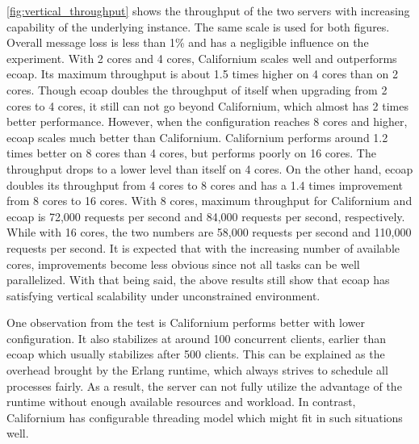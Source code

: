 \autoref{fig:vertical_throughput} shows the throughput of the two servers with increasing capability of the underlying instance. The same scale is used for both figures. Overall message loss is less than 1\% and has a negligible influence on the experiment. With 2 cores and 4 cores, Californium scales well and outperforms ecoap. Its maximum throughput is about 1.5 times higher on 4 cores than on 2 cores. Though ecoap doubles the throughput of itself when upgrading from 2 cores to 4 cores, it still can not go beyond Californium, which almost has 2 times better performance. However, when the configuration reaches 8 cores and higher, ecoap scales much better than Californium. Californium performs around 1.2 times better on 8 cores than 4 cores, but performs poorly on 16 cores. The throughput drops to a lower level than itself on 4 cores. On the other hand,  ecoap doubles its throughput from 4 cores to 8 cores and has a 1.4 times improvement from 8 cores to 16 cores. With 8 cores, maximum throughput for Californium and ecoap is 72,000 requests per second and 84,000 requests per second, respectively. While with 16 cores, the two numbers are 58,000 requests per second and 110,000 requests per second. It is expected that with the increasing number of available cores, improvements become less obvious since not all tasks can be well parallelized. With that being said, the above results still show that ecoap has satisfying vertical scalability under unconstrained environment. 

One observation from the test is Californium performs better with lower configuration. It also stabilizes at around 100 concurrent clients, earlier than ecoap which usually stabilizes after 500 clients. This can be explained as the overhead brought by the Erlang runtime, which always strives to schedule all processes fairly. As a result, the server can not fully utilize the advantage of the runtime without enough available resources and workload. In contrast, Californium has configurable threading model which might fit in such situations well.


